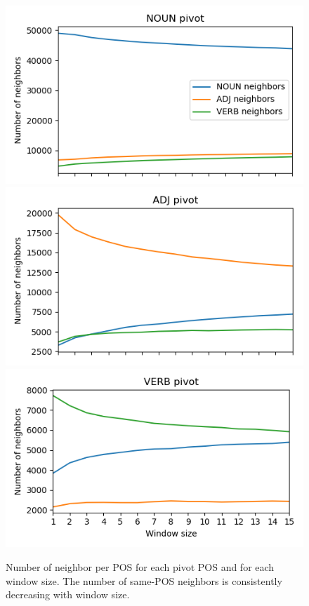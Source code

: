 \documentclass[11pt,a4paper]{article}
\begin{document}
    \begin{figure}[ht]
        \includegraphics[width=\columnwidth]{figs/NOUN_nn_100_fasttext_enwiki-20170501-clean_cbow-300d-min500_pos.png}
        \includegraphics[width=\columnwidth]{figs/ADJ_nn_100_fasttext_enwiki-20170501-clean_cbow-300d-min500_pos.png}
        \includegraphics[width=\columnwidth]{figs/VERB_nn_100_fasttext_enwiki-20170501-clean_cbow-300d-min500_pos.png}
	    \caption{Number of neighbor per POS for each pivot POS and for each window size.
	    The number of same-POS neighbors is consistently decreasing with window size.
	    \label{fig:nn_pos_hist}}
	\end{figure}
    
\end{document}
